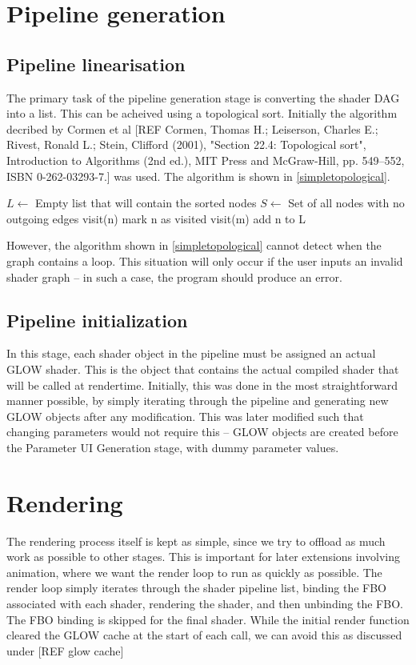 \documentclass[12pt,twoside,notitlepage]{report}
\begin{document}
\section{Pipeline generation}
\subsection*{Pipeline linearisation}
The primary task of the pipeline generation stage is converting the shader DAG into a list. This can be acheived using a topological sort. Initially the algorithm decribed by Cormen et al \cite{topsort} [REF 
Cormen, Thomas H.; Leiserson, Charles E.; Rivest, Ronald L.; Stein, Clifford (2001), "Section 22.4: Topological sort", Introduction to Algorithms (2nd ed.), MIT Press and McGraw-Hill, pp. 549–552, ISBN 0-262-03293-7.] was used. The algorithm is shown in \ref{simpletopological}.
\begin{algorithm}
\label{simpletopological}
\begin{algorithmic}
\State $L \gets $ Empty list that will contain the sorted nodes
\State $S \gets $ Set of all nodes with no outgoing edges
    visit(n)
\EndFor 
{}
        mark n as visited
            visit(m)
        \EndFor
        add n to L
    \EndIf
\EndFunction
\end{algorithmic}
\end{algorithm}
However, the algorithm shown in \ref{simpletopological} cannot detect when the graph contains a loop. This situation will only occur if the user inputs an invalid shader graph -- in such a case, the program should produce an error.

\subsection*{Pipeline initialization}
In this stage, each shader object in the pipeline must be assigned an actual GLOW shader. This is the object that contains the actual compiled shader that will be called at rendertime. Initially, this was done in the most straightforward manner possible, by simply iterating through the pipeline and generating new GLOW objects after any modification. This was later modified such that changing parameters would not require this -- GLOW objects are created before the Parameter UI Generation stage, with dummy parameter values. 

\section{Rendering}
The rendering process itself is kept as simple, since we try to offload as much work as possible to other stages. This is important for later extensions involving animation, where we want the render loop to run as quickly as possible. The render loop simply iterates through the shader pipeline list, binding the FBO associated with each shader, rendering the shader, and then unbinding the FBO. The FBO binding is skipped for the final shader. While the initial render function cleared the GLOW cache at the start of each call, we can avoid this as discussed under [REF glow cache]
\end{document}

